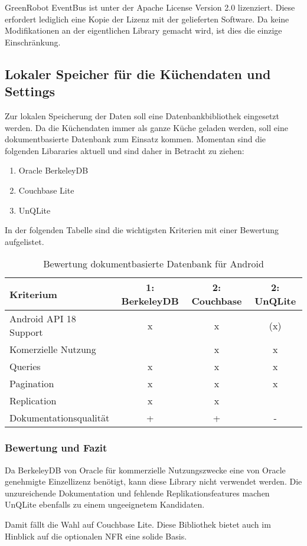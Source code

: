 GreenRobot EventBus ist unter der Apache License \cite{apache_license} Version 2.0  lizenziert. Diese erfordert lediglich eine Kopie der Lizenz mit der gelieferten Software. Da keine Modifikationen an der eigentlichen Library gemacht wird, ist dies die einzige Einschränkung.

\subsection{Lokaler Speicher für die Küchendaten und Settings}
Zur lokalen Speicherung der Daten soll eine Datenbankbibliothek eingesetzt werden. Da die Küchendaten immer als ganze Küche geladen werden, soll eine dokumentbasierte Datenbank zum Einsatz kommen. Momentan sind die folgenden Libararies aktuell und sind daher in Betracht zu ziehen:
\begin{enumerate}
\item Oracle BerkeleyDB
\item Couchbase Lite
\item UnQLite
\end{enumerate}

In der folgenden Tabelle sind die wichtigsten Kriterien mit einer Bewertung aufgelistet.

\begin{table}[H]
\begin{tabular}{|p{5cm}|c|c|c|}
 \hline 
\textbf{Kriterium} & \textbf{1: BerkeleyDB} & \textbf{2: Couchbase} & \textbf{2: UnQLite}
\\ \hline

Android API 18 Support & x & x & (x)
\\ \hline
Komerzielle Nutzung    &   & x & x
\\ \hline
Queries                & x & x & x
\\ \hline
Pagination             & x & x & x
\\ \hline
Replication            & x & x & 
\\ \hline
Dokumentationsqualität & + & + & -
\\ \hline
\end{tabular}
\caption{Bewertung dokumentbasierte Datenbank für Android}
\end{table}

\subsubsection{Bewertung und Fazit}
Da BerkeleyDB von Oracle für kommerzielle Nutzungszwecke eine von Oracle genehmigte Einzellizenz benötigt, kann diese Library nicht verwendet werden. Die unzureichende Dokumentation und fehlende Replikationsfeatures machen UnQLite ebenfalls zu einem ungeeignetem Kandidaten.

Damit fällt die Wahl auf Couchbase Lite. Diese Bibliothek bietet auch im Hinblick auf die optionalen \ac{NFR} eine solide Basis.